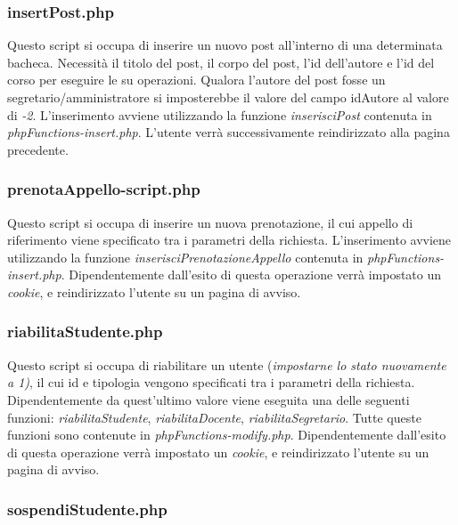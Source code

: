 \documentclass [a4paper,11pt]{book}
\begin{document}
\medskip

\subsubsection{insertPost.php}

Questo script si occupa di inserire un nuovo post all'interno di una determinata bacheca. Necessità il titolo del post, il corpo del post, l'id dell'autore e l'id del corso per eseguire le su operazioni. Qualora l'autore del post fosse un segretario/amministratore si imposterebbe il valore del campo idAutore al valore di \emph{-2}. L'inserimento avviene utilizzando la funzione \emph{inserisciPost} contenuta in \emph{phpFunctions-insert.php}.
L'utente verrà successivamente reindirizzato alla pagina precedente.

\medskip

\subsubsection{prenotaAppello-script.php}

Questo script si occupa di inserire un nuova prenotazione, il cui appello di riferimento viene specificato tra i parametri della richiesta. L'inserimento avviene utilizzando la funzione \emph{inserisciPrenotazioneAppello} contenuta in \emph{phpFunctions-insert.php}.
Dipendentemente dall'esito di questa operazione verrà impostato un \emph{cookie}, e reindirizzato l'utente su un pagina di avviso.

\medskip


\subsubsection{riabilitaStudente.php}

Questo script si occupa di riabilitare un utente (\emph{impostarne lo stato nuovamente a 1)}, il cui id e tipologia vengono specificati tra i parametri della richiesta. Dipendentemente da quest'ultimo valore viene eseguita una delle seguenti funzioni: \emph{riabilitaStudente}, \emph{riabilitaDocente}, \emph{riabilitaSegretario}. Tutte queste funzioni sono contenute in \emph{phpFunctions-modify.php}.
Dipendentemente dall'esito di questa operazione verrà impostato un \emph{cookie}, e reindirizzato l'utente su un pagina di avviso. 

\medskip

\subsubsection{sospendiStudente.php}
\end{document}
